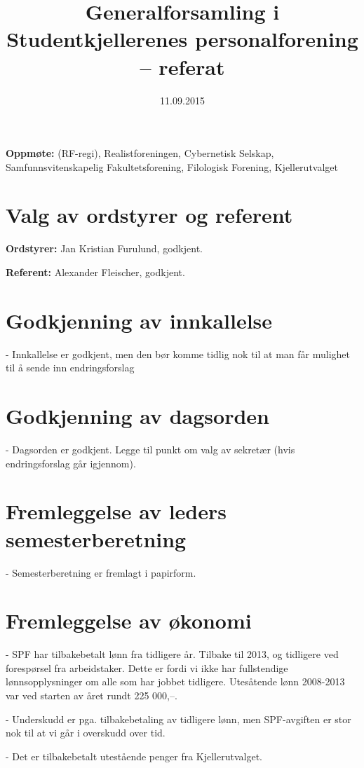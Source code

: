 \documentclass{article}[12pt]
\begin{document}
\title{Generalforsamling i Studentkjellerenes personalforening -- referat}
\date{11.09.2015}
\maketitle

\textbf{Oppmøte:} (RF-regi), Realistforeningen, Cybernetisk Selskap, Samfunnsvitenskapelig Fakultetsforening, Filologisk Forening, Kjellerutvalget

\section{Valg av ordstyrer og referent}

\textbf{Ordstyrer:} Jan Kristian Furulund, godkjent.

\textbf{Referent:} Alexander Fleischer, godkjent.

\section{Godkjenning av innkallelse}
	- Innkallelse er godkjent, men den bør komme tidlig nok til at man får mulighet til å sende inn endringsforslag

\section{Godkjenning av dagsorden}
	- Dagsorden er godkjent. Legge til punkt om valg av sekretær (hvis endringsforslag går igjennom).
	
\section{Fremleggelse av leders semesterberetning}
	- Semesterberetning er fremlagt i papirform.

\section{Fremleggelse av økonomi}
	- SPF har tilbakebetalt lønn fra tidligere år. Tilbake til 2013, og tidligere
	ved forespørsel fra arbeidstaker. 
	Dette er fordi vi ikke har fullstendige lønnsopplysninger 
	om alle som har jobbet tidligere. 
	Utesåtende lønn 2008-2013 var ved starten av
	året rundt 225 000,–.
	
	- Underskudd er pga. tilbakebetaling av tidligere lønn, men SPF-avgiften er
	stor nok til at vi går i overskudd over tid.
	
	- Det er tilbakebetalt utestående penger fra Kjellerutvalget.
	
\end{document}
